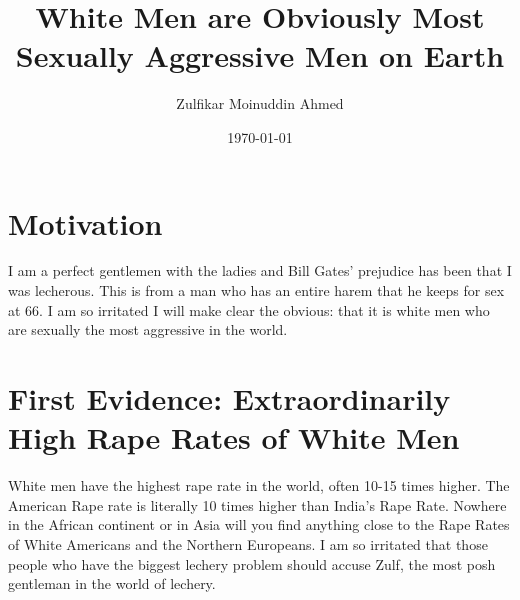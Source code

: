 \documentclass{amsart}
\title{White Men are Obviously Most Sexually Aggressive Men on Earth}
\author{Zulfikar Moinuddin Ahmed}
\date{\today}
\begin{document}
\maketitle

\section{Motivation}

I am a perfect gentlemen with the ladies and Bill Gates' prejudice has been that I was lecherous.  This is from a man who has an entire harem that he keeps for sex at 66.  I am so irritated I will make clear the obvious: that it is white men who are sexually the most aggressive in the world.

\section{First Evidence: Extraordinarily High Rape Rates of White Men}

White men have the highest rape rate in the world, often 10-15 times higher.  The American Rape rate is literally 10 times higher than India's Rape Rate.  Nowhere in the African continent or in Asia will you find anything close to the Rape Rates of White Americans and the Northern Europeans.  I am so irritated that those people who have the biggest lechery problem should accuse Zulf, the most posh gentleman in the world of lechery.  
\end{document}
